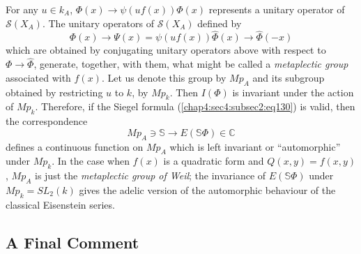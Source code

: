 \begin{Remark*}
  For any $u\in k_{A}$, $\Phi(x)\to \psi(uf(x))\Phi(x)$ represents a
  unitary operator of $\mathscr{S}(X_{A})$. The unitary operators of
  $\mathscr{S}(X_{A})$ defined by
  $$
  \Phi(x)\to \Psi(x)=\psi(uf(x))\hat{\Phi}(x)\to \hat{\Phi}(-x)
  $$
  which are obtained by conjugating unitary operators above with respect
  to $\Phi\to \hat{\Phi}$, generate, together, with them, what might
  be called a {\em metaplectic group} associated with\pageoriginale
  $f(x)$. Let us denote this group by $Mp_{A}$ and its subgroup obtained
  by restricting $u$ to $k$, by $Mp_{k}$. Then $I(\Phi)$ is invariant
  under the action of $Mp_{k}$. Therefore, if the Siegel formula
  (\ref{chap4:sec4:subsec2:eq130}) is valid, then the correspondence
  $$
  Mp_{A}\ni \mathbb{S}\to E(\mathbb{S}\Phi)\in\mathbb{C}
  $$
  defines a continuous function on $Mp_{A}$ which is left invariant or
  ``automorphic'' under $Mp_{k}$. In the case when $f(x)$ is a quadratic
  form and $Q(x,y)=f(x,y)$, $Mp_{A}$ is just the {\em metaplectic group
    of Weil}; the invariance of $E(\mathbb{S}\Phi)$ under
  $Mp_{k}=SL_{2}(k)$ gives the adelic version of the automorphic
  behaviour of the classical Eisenstein series.
\end{Remark*}

\subsection{A Final Comment}\label{chap4:sec4:subsec3} %

